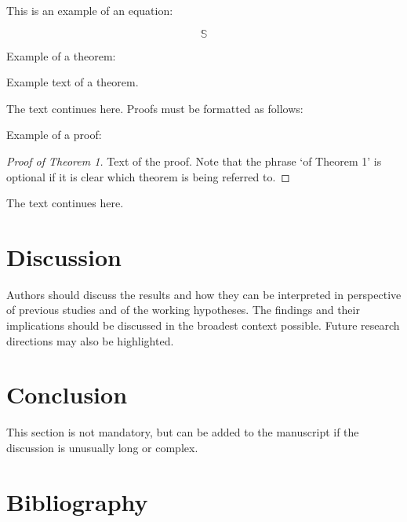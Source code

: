 \documentclass[water,article,submit,moreauthors,pdftex]{mdpi}
\begin{document}
This is an example of an equation:

\begin{equation}
\mathbb{S}
\end{equation}

Example of a theorem:

\begin{Theorem}
Example text of a theorem.
\end{Theorem}

The text continues here. Proofs must be formatted as follows:

Example of a proof:

\begin{proof}[Proof of Theorem 1]
Text of the proof. Note that the phrase `of Theorem 1' is optional if it is clear which theorem is being referred to.
\end{proof}

The text continues here.

\hypertarget{discussion}{%
\section{Discussion}\label{discussion}}

Authors should discuss the results and how they can be interpreted in
perspective of previous studies and of the working hypotheses. The
findings and their implications should be discussed in the broadest
context possible. Future research directions may also be highlighted.

\hypertarget{conclusion}{%
\section{Conclusion}\label{conclusion}}

This section is not mandatory, but can be added to the manuscript if the
discussion is unusually long or complex.

\hypertarget{bibliography}{%
\section{Bibliography}\label{bibliography}}

\citet{angwin2016machine} \citet{bao2021s} \citet{barocas2017fairness}
\citet{baumer2017texts} \citet{equivant_response_2018}
\citet{gebru2021datasheets} \citet{hardin2015data}
\citet{james2013introduction} \citet{knight2020automated}
\citet{kypraiou_what_2021} \citet{larson2016technical}
\citet{larson2016we} \citet{noauthor_ai_nodate}
\citet{noauthor_aif360datasetscompasdataset_2018}
\citet{noauthor_trusted-ai_360}
\citet{noauthor_propublicacompas-analysis_2022}
\citet{noauthor_womenthetable_nodate} \citet{vartan_1st_2022}
\end{document}
